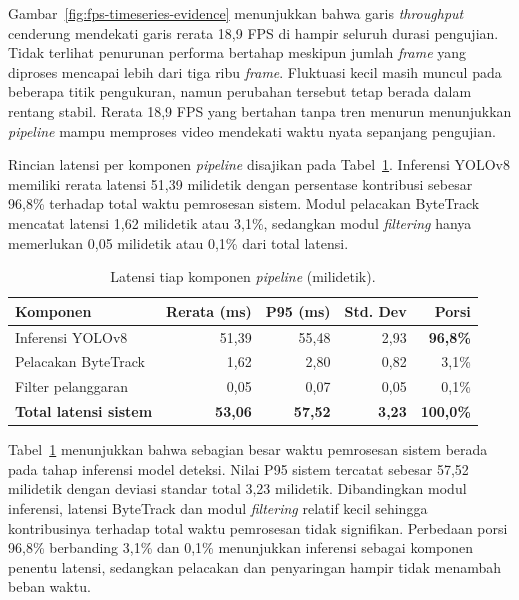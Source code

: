 Gambar~\ref{fig:fps-timeseries-evidence} menunjukkan bahwa garis \textit{throughput} cenderung mendekati garis rerata 18,9 FPS di hampir seluruh durasi pengujian. Tidak terlihat penurunan performa bertahap meskipun jumlah \textit{frame} yang diproses mencapai lebih dari tiga ribu \textit{frame}. Fluktuasi kecil masih muncul pada beberapa titik pengukuran, namun perubahan tersebut tetap berada dalam rentang stabil. Rerata 18,9 FPS yang bertahan tanpa tren menurun menunjukkan \textit{pipeline} mampu memproses video mendekati waktu nyata sepanjang pengujian.

Rincian latensi per komponen \textit{pipeline} disajikan pada Tabel~\ref{tab:latency-decomposition}. Inferensi YOLOv8 memiliki rerata latensi 51,39 milidetik dengan persentase kontribusi sebesar 96,8\% terhadap total waktu pemrosesan sistem. Modul pelacakan ByteTrack mencatat latensi 1,62 milidetik atau 3,1\%, sedangkan modul \textit{filtering} hanya memerlukan 0,05 milidetik atau 0,1\% dari total latensi.

\begin{table}[htbp]
\centering
\caption{Latensi tiap komponen \textit{pipeline} (milidetik).}
\label{tab:latency-decomposition}
\small
\setlength{\tabcolsep}{4pt}
\begin{tabularx}{\textwidth}{>{\RaggedRight\arraybackslash}Xrrrr}
\toprule
\textbf{Komponen} & \textbf{Rerata (ms)} & \textbf{P95 (ms)} & \textbf{Std. Dev} & \textbf{Porsi} \\
\midrule
Inferensi YOLOv8 & 51,39 & 55,48 & 2,93 & \textbf{96,8\%} \\
Pelacakan ByteTrack & 1,62 & 2,80 & 0,82 & 3,1\% \\
Filter pelanggaran & 0,05 & 0,07 & 0,05 & 0,1\% \\
\midrule
\textbf{Total latensi sistem} & \textbf{53,06} & \textbf{57,52} & \textbf{3,23} & \textbf{100,0\%} \\
\bottomrule
\end{tabularx}
\end{table}

Tabel~\ref{tab:latency-decomposition} menunjukkan bahwa sebagian besar waktu pemrosesan sistem berada pada tahap inferensi model deteksi. Nilai P95 sistem tercatat sebesar 57,52 milidetik dengan deviasi standar total 3,23 milidetik. Dibandingkan modul inferensi, latensi ByteTrack dan modul \textit{filtering} relatif kecil sehingga kontribusinya terhadap total waktu pemrosesan tidak signifikan. Perbedaan porsi 96,8\% berbanding 3,1\% dan 0,1\% menunjukkan inferensi sebagai komponen penentu latensi, sedangkan pelacakan dan penyaringan hampir tidak menambah beban waktu.

